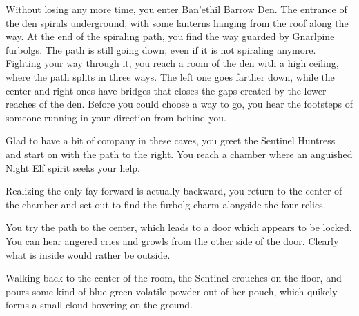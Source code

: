 

Without losing any more time, you enter Ban'ethil Barrow Den. The entrance of the den spirals underground, with some lanterns hanging from the roof along the way. At the end of the spiraling path, you find the way guarded by Gnarlpine furbolgs. The path is still going down, even if it is not spiraling anymore. Fighting your way through it, you reach a room of the den with a high ceiling, where the path splits in three ways. The left one goes farther down, while the center and right ones have bridges that closes the gaps created by the lower reaches of the den. Before you could choose a way to go, you hear the footsteps of someone running in your direction from behind you.



Glad to have a bit of company in these caves, you greet the Sentinel Huntress and start on with the path to the right. You reach a chamber where an anguished Night Elf spirit seeks your help.


Realizing the only fay forward is actually backward, you return to the center of the chamber and set out to find the furbolg charm alongside the four relics.

You try the path to the center, which leads to a door which appears to be locked. You can hear angered cries and growls from the other side of the door. Clearly what is inside would rather be outside.




Walking back to the center of the room, the Sentinel crouches on the floor, and pours some kind of blue-green volatile powder out of her pouch, which quikcly forms a small cloud hovering on the ground.

